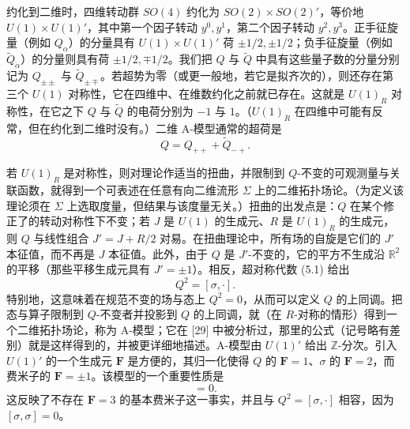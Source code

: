 \documentclass[11pt,a4paper,UTF8]{ctexart}
\theoremstyle{plain}
\theoremstyle{definition}
\begin{document}
约化到二维时，四维转动群 $SO(4)$ 约化为 $SO(2)\times SO(2)'$，等价地 $U(1)\times U(1)'$，其中第一个因子转动 $y^0,y^1$，第二个因子转动 $y^2,y^3$。正手征旋量（例如 $Q_\alpha$）的分量具有 $U(1)\times U(1)'$ 荷 $\pm 1/2,\pm 1/2$；负手征旋量（例如 $\tilde Q_{\dot\alpha}$）的分量则具有荷 $\pm 1/2,\mp 1/2$。我们把 $Q$ 与 $\tilde Q$ 中具有这些量子数的分量分别记为 $Q_{\pm\pm}$ 与 $\tilde Q_{\pm\mp}$。若超势为零（或更一般地，若它是拟齐次的），则还存在第三个 $U(1)$ 对称性，它在四维中、在维数约化之前就已存在。这就是 $U(1)_R$ 对称性，在它之下 $Q$ 与 $\tilde Q$ 的电荷分别为 $-1$ 与 $1$。（$U(1)_R$ 在四维中可能有反常，但在约化到二维时没有。）二维 A-模型通常的超荷是
\begin{equation}
    Q=Q_{++}+\tilde Q_{-+}.
    \tag{5.2}
\end{equation}


若 $U(1)_R$ 是对称性，则对理论作适当的扭曲，并限制到 $Q$-不变的可观测量与关联函数，就得到一个可表述在任意有向二维流形 $\Sigma$ 上的二维拓扑场论。（为定义该理论须在 $\Sigma$ 上选取度量，但结果与该度量无关。）扭曲的出发点是：$Q$ 在某个修正了的转动对称性下不变；若 $J$ 是 $U(1)$ 的生成元、$R$ 是 $U(1)_R$ 的生成元，则 $Q$ 与线性组合 $J'=J+R/2$ 对易。在扭曲理论中，所有场的自旋是它们的 $J'$ 本征值，而不再是 $J$ 本征值。此外，由于 $Q$ 是 $J'$-不变的，它的平方不生成沿 $\mathbb R^2$ 的平移（那些平移生成元具有 $J'=\pm1$）。相反，超对称代数 (5.1) 给出
\begin{equation}
    Q^2=[\sigma,\cdot].
    \tag{5.3}
\end{equation}
特别地，这意味着在规范不变的场与态上 $Q^2=0$，从而可以定义 $Q$ 的上同调。把态与算子限制到 $Q$-不变者并投影到 $Q$ 的上同调，就（在 $R$-对称的情形）得到一个二维拓扑场论，称为 A-模型；它在 [29] 中被分析过，那里的公式（记号略有差别）就是这样得到的，并被更详细地描述。A-模型由 $U(1)'$ 给出 $\mathbb Z$-分次。引入 $U(1)'$ 的一个生成元 $\mathbf F$ 是方便的，其归一化使得 $Q$ 的 $\mathbf F=1$、$\sigma$ 的 $\mathbf F=2$，而费米子的 $\mathbf F=\pm1$。该模型的一个重要性质是
\begin{equation}
    [Q,\sigma]=0.
    \tag{5.4}
\end{equation}
这反映了不存在 $\mathbf F=3$ 的基本费米子这一事实，并且与 $Q^2=[\sigma,\cdot]$ 相容，因为 $[\sigma,\sigma]=0$。
\end{document}

